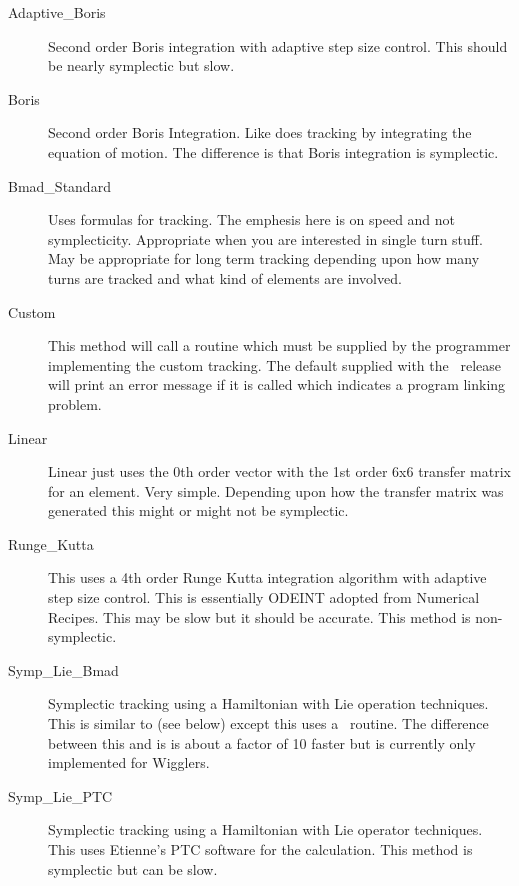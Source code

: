 \begin{description}
\item[Adaptive\_Boris]
Second order Boris integration\cite{b:boris} with adaptive step size control.
This should be nearly symplectic but slow.

\item[Boris]
Second order Boris Integration. Like   does
tracking by integrating the equation of motion. The difference is that
Boris integration is symplectic.

\item[Bmad\_Standard]
Uses formulas for tracking. The emphesis here is on speed and not
symplecticity. Appropriate when you are interested in single turn
stuff. May be appropriate for long term tracking depending upon how
many turns are tracked and what kind of elements are involved. 

\item[Custom]
This method will call a routine  which must be
supplied by the programmer implementing the custom tracking. The
default  supplied with the \bmad\ release will print
an error message if it is called which indicates a program linking
problem.

\item[Linear]
Linear just uses the 0th order vector with the 1st order 6x6 transfer
matrix for an element. Very simple.  Depending upon how the transfer
matrix was generated this might or might not be symplectic.

\item[Runge\_Kutta]
This uses a 4th order Runge Kutta integration algorithm with adaptive
step size control.  This is essentially ODEINT adopted from Numerical
Recipes\cite{b:nr}. This may be slow but it should be accurate. This
method is non-symplectic.

\item[Symp\_Lie\_Bmad]
Symplectic tracking using a Hamiltonian with Lie operation techniques.
This is similar to  (see below) except this uses a
\bmad\ routine.  The difference between this and  is
 is about a factor of 10 faster but  is
currently only implemented for Wigglers.

\item[Symp\_Lie\_PTC]
Symplectic tracking using a Hamiltonian with Lie operator techniques.
This uses Etienne's PTC software for the calculation. This method is
symplectic but can be slow.


\end{description}

